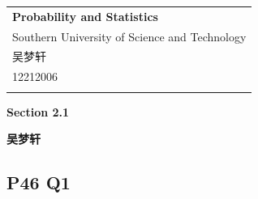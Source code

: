 \documentclass[a4paper,12pt]{ctexart}
\begin{document}
\thispagestyle{empty} %

\begin{tabular}{p{15.5cm}}
{\large \bf Probability and Statistics} \\
Southern University of Science and Technology \\ 吴梦轩 \\ 12212006 \\
\hline
\\
\end{tabular}

\vspace*{0.3cm} %

\begin{center}
	{\Large \bf Section 2.1}
	\vspace{2mm}

	{\bf 吴梦轩}
		
\end{center}  

\vspace{0.4cm}

\subsection*{P46 Q1}
\end{document}
